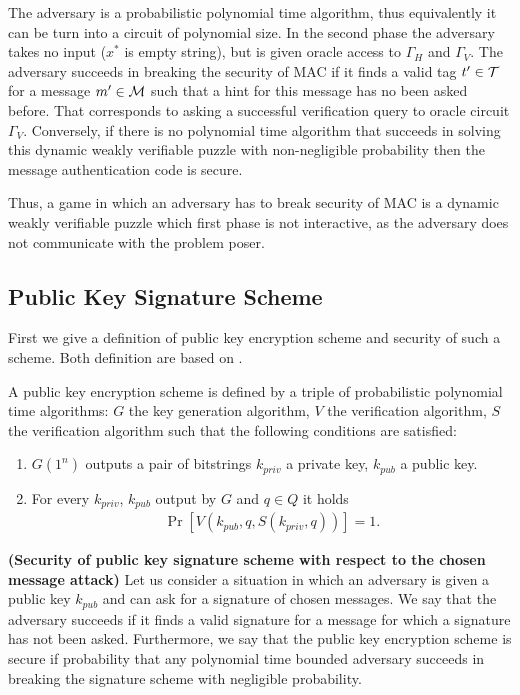 \documentclass[11pt,a4paper,titlepage]{memoir}
\begin{document}
The adversary is a probabilistic polynomial time algorithm, thus equivalently it can be turn into a circuit of polynomial size.
In the second phase the adversary takes no input ($x^*$ is empty string), but is given oracle access to $\Gamma_H$ and $\Gamma_V$.
The adversary succeeds in breaking the security of MAC if it finds a valid tag $t' \in \mathcal{T}$ for a message $m' \in \mathcal{M}$ such that a hint for this message
has no been asked before. That corresponds to asking a successful verification query to oracle circuit $\Gamma_V$.
Conversely, if there is no polynomial time algorithm that succeeds in solving this dynamic weakly verifiable puzzle with non-negligible probability
then the message authentication code is secure.

Thus, a game in which an adversary has to break security of MAC is a dynamic weakly verifiable puzzle which first phase is not interactive,
as the adversary does not communicate with the problem poser.

\subsection{Public Key Signature Scheme}
First we give a definition of public key encryption scheme and security of such a scheme. Both definition are based on \cite{Goldreich:2004:FCV:975541}.

\begin{definition}
A public key encryption scheme is defined by a triple of probabilistic polynomial time algorithms:
$G$ the key generation algorithm, $V$ the verification algorithm, $S$ the verification algorithm such that the following conditions are satisfied:
\begin{enumerate}[]
  \item $G(1^n)$ outputs a pair of bitstrings $k_{priv}$ a private key, $k_{pub}$ a public key.
  \item For every $k_{priv}$, $k_{pub}$ output by $G$ and $q \in Q$ it holds
    \begin{align*}
      \Pr[V(k_{pub}, q, S(k_{priv}, q))] = 1.
    \end{align*}
\end{enumerate}
\end{definition}


\begin{definition}\textbf{(Security of public key signature scheme with respect to the chosen message attack)}
Let us consider a situation in which an adversary is given a public key $k_{pub}$ and can ask for a signature of chosen messages.
We say that the adversary succeeds if it finds a valid signature for a message for which a signature has not been asked.
Furthermore, we say that the public key encryption scheme is secure if probability that any polynomial time bounded adversary
succeeds in breaking the signature scheme with negligible probability.
\end{definition}
\end{document}
